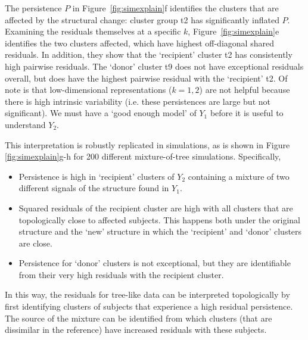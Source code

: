 \documentclass[a4]{article}
\newcommand{\+}[1]{\mathbf{#1}}
\begin{document}
The persistence $P$ in Figure~\ref{fig:simexplain}f identifies the clusters that are affected by the structural change: cluster group t2 has significantly inflated $P$. Examining the residuals themselves at a specific $k$, Figure~\ref{fig:simexplain}e identifies the two clusters affected, which have highest off-diagonal shared residuals. In addition, they show that the `recipient' cluster t2 has consistently high pairwise residuals. The `donor' cluster t9 does not have exceptional residuals overall, but does have the highest pairwise residual with the `recipient' t2.
Of note is that low-dimensional representations ($k=1,2$) are not helpful because there is high intrinsic variability (i.e. these persistences are large but not significant). We must have a `good enough model' of $Y_1$ before it is useful to understand $Y_2$.

This interpretation is robustly replicated in simulations, as is shown in Figure \ref{fig:simexplain}g-h for 200 different mixture-of-tree simulations. Specifically, %
\begin{itemize}
\item Persistence is high in `recipient' clusters of $Y_2$ containing a mixture of two different signals of the structure found in $Y_1$.
\item Squared residuals of the recipient cluster are high with all clusters that are topologically close to affected subjects. This happens both under the original structure and the `new' structure in which the `recipient' and `donor' clusters are close.
\item Persistence for `donor' clusters is not exceptional, but they are identifiable from their very high residuals with the recipient cluster.
\end{itemize}
In this way, the residuals for tree-like data can be interpreted topologically by first identifying clusters of subjects that experience a high residual persistence. The source of the mixture can be identified from which clusters (that are dissimilar in the reference) have increased residuals with these subjects.
\end{document}

